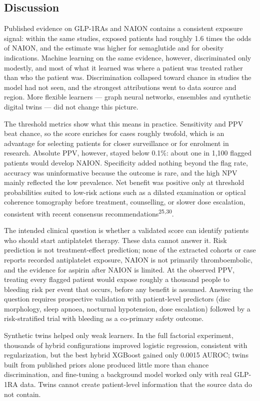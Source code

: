 \documentclass[
  11pt,
]{article}
\begin{document}
\subsection{Discussion}\label{discussion}

Published evidence on GLP-1RAs and NAION contains a consistent exposure
signal: within the same studies, exposed patients had roughly 1.6 times
the odds of NAION, and the estimate was higher for semaglutide and for
obesity indications. Machine learning on the same evidence, however,
discriminated only modestly, and most of what it learned was where a
patient was treated rather than who the patient was. Discrimination
collapsed toward chance in studies the model had not seen, and the
strongest attributions went to data source and region. More flexible
learners --- graph neural networks, ensembles and synthetic digital
twins --- did not change this picture.

The threshold metrics show what this means in practice. Sensitivity and
PPV beat chance, so the score enriches for cases roughly twofold, which
is an advantage for selecting patients for closer surveillance or for
enrolment in research. Absolute PPV, however, stayed below 0.1\%: about
one in 1,100 flagged patients would develop NAION. Specificity added
nothing beyond the flag rate, accuracy was uninformative because the
outcome is rare, and the high NPV mainly reflected the low prevalence.
Net benefit was positive only at threshold probabilities suited to
low-risk actions such as a dilated examination or optical coherence
tomography before treatment, counselling, or slower dose escalation,
consistent with recent consensus recommendations\textsuperscript{25,30}.

The intended clinical question is whether a validated score can identify
patients who should start antiplatelet therapy. These data cannot answer
it. Risk prediction is not treatment-effect prediction; none of the
extracted cohorts or case reports recorded antiplatelet exposure, NAION
is not primarily thromboembolic, and the evidence for aspirin after
NAION is limited. At the observed PPV, treating every flagged patient
would expose roughly a thousand people to bleeding risk per event that
occurs, before any benefit is assumed. Answering the question requires
prospective validation with patient-level predictors (disc morphology,
sleep apnoea, nocturnal hypotension, dose escalation) followed by a
risk-stratified trial with bleeding as a co-primary safety outcome.

Synthetic twins helped only weak learners. In the full factorial
experiment, thousands of hybrid configurations improved logistic
regression, consistent with regularization, but the best hybrid XGBoost
gained only 0.0015 AUROC; twins built from published priors alone
produced little more than chance discrimination, and fine-tuning a
background model worked only with real GLP-1RA data. Twins cannot create
patient-level information that the source data do not contain.
\end{document}
